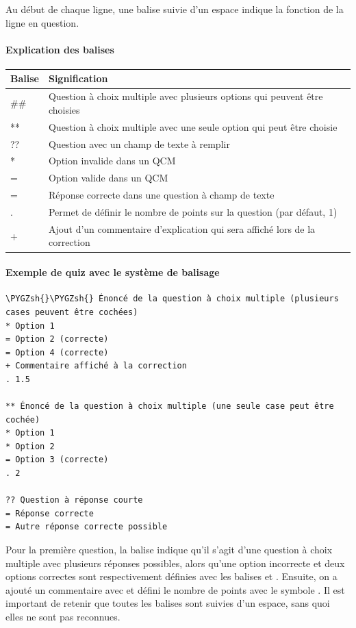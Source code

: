 \documentclass[a4paper,11pt,openany,oneside]{sphinxmanual}
\def\PYGZsh{\char`\#}
\begin{document}
Au début de chaque ligne, une balise suivie d'un espace indique la fonction de la ligne en question.


\paragraph{Explication des balises}
\label{doc-user:explication-des-balises}
\begin{tabulary}{\linewidth}{|L|L|}
\hline
\textsf{\relax 
Balise
} & \textsf{\relax 
Signification
}\\
\hline
\#\#
 & 
Question à choix multiple avec plusieurs options qui peuvent être choisies
\\
\hline
**
 & 
Question à choix multiple avec une seule option qui peut être choisie
\\
\hline
??
 & 
Question avec un champ de texte à remplir
\\
\hline
*
 & 
Option invalide dans un QCM
\\
\hline
=
 & 
Option valide dans un QCM
\\
\hline
=
 & 
Réponse correcte dans une question à champ de texte
\\
\hline
.
 & 
Permet de définir le nombre de points sur la question (par défaut, 1)
\\
\hline
+
 & 
Ajout d'un commentaire d'explication qui sera affiché lors de la correction
\\
\hline\end{tabulary}



\paragraph{Exemple de quiz avec le système de balisage}
\label{doc-user:exemple-de-quiz-avec-le-systeme-de-balisage}
\begin{Verbatim}[commandchars=\\\{\}]
\PYGZsh{}\PYGZsh{} Énoncé de la question à choix multiple (plusieurs cases peuvent être cochées)
* Option 1
= Option 2 (correcte)
= Option 4 (correcte)
+ Commentaire affiché à la correction
. 1.5

** Énoncé de la question à choix multiple (une seule case peut être cochée)
* Option 1
* Option 2
= Option 3 (correcte)
. 2

?? Question à réponse courte
= Réponse correcte
= Autre réponse correcte possible
\end{Verbatim}

Pour la première question, la balise \code{\#\#} indique qu'il s'agit d'une question à choix multiple avec plusieurs réponses possibles, alors qu'une option incorrecte et deux options correctes sont respectivement définies avec les balises \code{*} et \code{=}. Ensuite, on a ajouté un commentaire avec \code{+} et défini le nombre de points avec le symbole . Il est important de retenir que toutes les balises sont suivies d'un espace, sans quoi elles ne sont pas reconnues.
\end{document}
